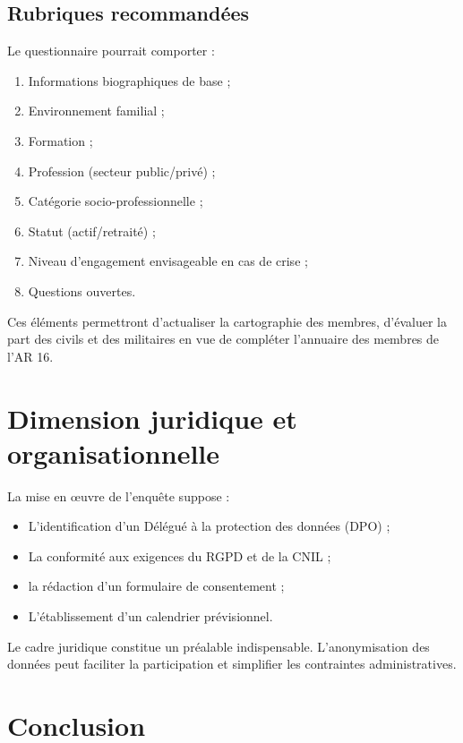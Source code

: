 \documentclass[12pt,a4paper]{article}
\begin{document}
\subsection{Rubriques recommandées}

Le questionnaire pourrait comporter :

\begin{enumerate}
    \item Informations biographiques de base ;
    \item Environnement familial ;
    \item Formation ;
    \item Profession (secteur public/privé) ;
    \item Catégorie socio-professionnelle ;
    \item Statut (actif/retraité) ;
    \item Niveau d'engagement envisageable en cas de crise ;
    \item Questions ouvertes.
\end{enumerate}

Ces éléments permettront d'actualiser la cartographie des membres, d'évaluer la part des civils et des militaires en vue de compléter l'annuaire des membres de l'AR 16.

\section{Dimension juridique et organisationnelle}

La mise en œuvre de l'enquête suppose :

\begin{itemize}
    \item L'identification d'un Délégué à la protection des données (DPO) ;
    \item La conformité aux exigences du RGPD et de la CNIL ;
    \item la rédaction d'un formulaire de consentement ;
    \item L'établissement d'un calendrier prévisionnel.
\end{itemize}

Le cadre juridique constitue un préalable indispensable. L'anonymisation des données peut faciliter la participation et simplifier les contraintes administratives.

\section{Conclusion}
\end{document}
